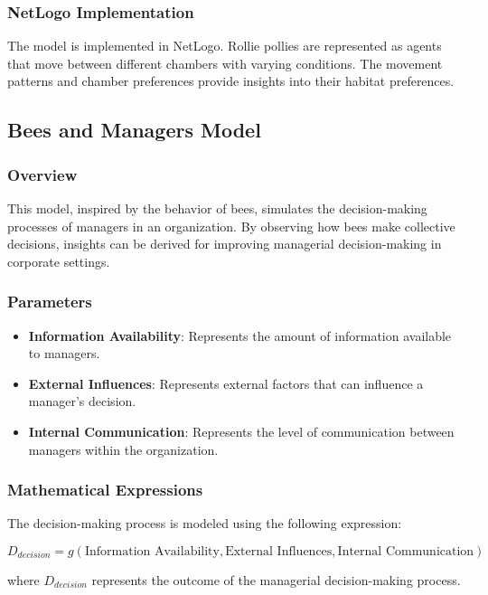 \documentclass[sn-nature]{sn-jnl}%
\theoremstyle{thmstyleone}%
\theoremstyle{thmstyletwo}%
\theoremstyle{thmstylethree}%
\begin{document}
\subsubsection{NetLogo Implementation}
The model is implemented in NetLogo. Rollie pollies are represented as agents that move between different chambers with varying conditions. The movement patterns and chamber preferences provide insights into their habitat preferences.

\subsection{Bees and Managers Model}

\subsubsection{Overview}
This model, inspired by the behavior of bees, simulates the decision-making processes of managers in an organization. By observing how bees make collective decisions, insights can be derived for improving managerial decision-making in corporate settings.

\subsubsection{Parameters}
\begin{itemize}
    \item \textbf{Information Availability}: Represents the amount of information available to managers.
    \item \textbf{External Influences}: Represents external factors that can influence a manager's decision.
    \item \textbf{Internal Communication}: Represents the level of communication between managers within the organization.
\end{itemize}

\subsubsection{Mathematical Expressions}
The decision-making process is modeled using the following expression:

\begin{equation}
D_{decision} = g(\text{Information Availability}, \text{External Influences}, \text{Internal Communication})
\end{equation}

where \( D_{decision} \) represents the outcome of the managerial decision-making process.
\end{document}
